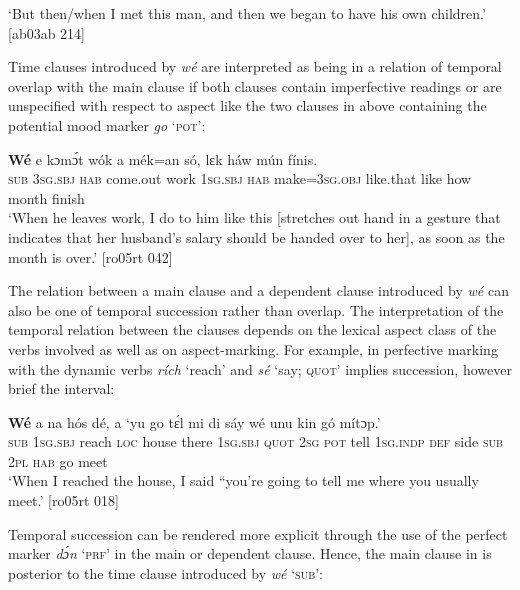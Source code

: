 \glt ‘But then/when I met this man, and then we began to have his
own children.’ [ab03ab 214]
\z

Time clauses introduced by \textit{wé} are interpreted as being in a relation of temporal overlap with the main clause if both clauses contain imperfective readings  or are unspecified with respect to aspect like the two clauses in  above containing the potential mood marker \textit{go} ‘\textsc{pot}’:


\ea%
    \label{ex:key:1460}
    \gll \textbf{Wé}  e      kɔmɔ́t    wók    a      mék=an    só,
lɛk  háw    mún    fínis.\\
\textsc{sub}  \textsc{3sg.sbj}  \textsc{hab}  come.out  work  \textsc{1sg.sbj}  \textsc{hab}  make=\textsc{3sg.obj}  like.that
like  how    month  finish\\

\glt ‘When he leaves work, I do to him like this [stretches out hand in a gesture
that indicates that her husband’s salary should be handed over to her], 
as soon as the month is over.’ [ro05rt 042]
\z

The relation between a main clause and a dependent clause introduced by \textit{wé} can also be one of temporal succession rather than overlap. The interpretation of the temporal relation between the clauses depends on the lexical aspect class of the verbs involved as well as on aspect-marking. For example, in  perfective marking with the dynamic verbs \textit{rích} ‘reach’ and \textit{sé} ‘say; \textsc{quot’} implies succession, however brief the interval:


\ea%
    \label{ex:key:1461}
    \gll \textbf{Wé}  a        na  hós    dé,    a      
‘yu  go  tɛ́l  mi    di  sáy  wé  unu  kin  gó  mítɔp.’\\
\textsc{sub}  \textsc{1sg.sbj}  reach  \textsc{loc}  house  there  \textsc{1sg.sbj}  \textsc{quot}  
\textsc{2sg}  \textsc{pot}  tell  \textsc{1sg.indp}  \textsc{def}  side  \textsc{sub}  \textsc{2pl}  \textsc{hab}  go  meet\\

\glt ‘When I reached the house, I said “you’re going to tell me where 
you usually meet.’ [ro05rt 018]
\z

Temporal succession can be rendered more explicit through the use of the perfect marker \textit{dɔ́n} ‘\textsc{prf’} in the main or dependent clause. Hence, the main clause in  is posterior to the time clause introduced by \textit{wé} ‘\textsc{sub}’:


